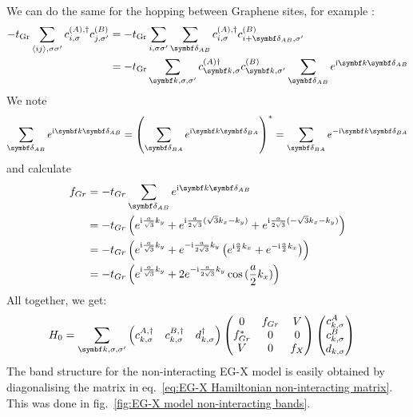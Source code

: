 \documentclass[../notes.tex]{subfiles}
\begin{document}
We can do the same for the hopping between Graphene sites, for example :
\begin{align}
	-t_{\mathrm{Gr}} \sum_{\langle ij \rangle, \sigma \sigma^{\prime}} c_{i, \sigma}^{(A), \dagger} c_{j, \sigma^{\prime}}^{(B)}
	&= -t_{\mathrm{Gr}} \sum_{i, \sigma \sigma^{\prime}} \sum_{\vb{\delta}_{AB}} c_{i, \sigma}^{(A), \dagger} c_{i + \vb{\delta}_{AB} , \sigma^{\prime}}^{(B)} \\
	&= -t_{\mathrm{Gr}} \sum_{\vb{k}, \sigma, \sigma^{\prime}}  c_{\vb{k}, \sigma}^{(A) \dagger} c_{\vb{k}, \sigma^{\prime}}^{(B)} \sum_{\vb{\delta}_{AB}} e^{\iu \vb{k} \vb{\delta}_{AB}}
\end{align}
We note
\begin{align}
	\sum_{\vb{\delta}_{AB}} e^{\iu \vb{k} \vb{\delta}_{AB}} = \left( \sum_{\vb{\delta}_{BA}} e^{\iu \vb{k} \vb{\delta}_{BA}} \right)^* = \sum_{\vb{\delta}_{BA}} e^{-\iu \vb{k} \vb{\delta}_{BA}}
\end{align}
and calculate
\begin{align}
	f_{Gr} &= -t_{Gr} \sum_{\vb{\delta}_{AB}} e^{\iu \vb{k} \vb{\delta}_{AB}} \\
	&= -t_{Gr} \left(
	e^{\iu \frac{a}{\sqrt{3}} k_y} +
	e^{\iu \frac{a}{2\sqrt{3}} (\sqrt{3} k_x - k_y)} +
	e^{\iu \frac{a}{2\sqrt{3}} (-\sqrt{3} k_x - k_y)} \right) \\
	&= -t_{Gr} \left(
	e^{\iu \frac{a}{\sqrt{3}} k_y} +
	e^{-\iu \frac{a}{2\sqrt{3}} k_y} \left(
	e^{\iu \frac{a}{2} k_x} + e^{-\iu \frac{a}{2} k_x}
	\right) \right) \\
	&= -t_{Gr} \left(
	e^{\iu \frac{a}{\sqrt{3}} k_y} +
	2 e^{-\iu \frac{a}{2\sqrt{3}} k_y}
	\cos{(\frac{a}{2} k_x)} \right)
\end{align}
All together, we get:
\begin{align}
	H_0 &= \sum_{\vb{k}, \sigma, \sigma^{\prime}} \begin{pmatrix} c_{k, \sigma}^{A, \dagger} & c_{k, \sigma}^{B, \dagger} & d_{k, \sigma}^{\dagger} \end{pmatrix}
	\begin{pmatrix}
		0 & f_{Gr} & V \\
		f_{Gr}^* & 0 & 0 \\
		V & 0 & f_{X}
	\end{pmatrix} \begin{pmatrix} c_{k, \sigma}^{A} \\ c_{k, \sigma}^{B} \\ d_{k, \sigma} \end{pmatrix}
	\label{eq:EG-X Hamiltonian non-interacting matrix}
\end{align}
The band structure for the non-interacting EG-X model is easily obtained by diagonalising the matrix in eq.~\ref{eq:EG-X Hamiltonian non-interacting matrix}.
This was done in fig.~\ref{fig:EG-X model non-interacting bands}.
\end{document}
